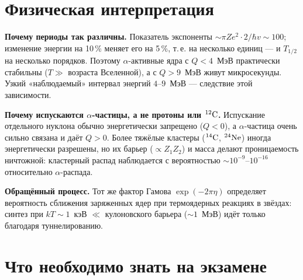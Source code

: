 \section{Физическая интерпретация}

\textbf{Почему периоды так различны.} Показатель экспоненты $\sim\pi Ze^2\cdot2/\hbar v\sim100$; изменение энергии на 10\,\% меняет его на 5\,\%,
т.\,е. на несколько единиц — и $T_{1/2}$ на несколько порядков. Поэтому $\alpha$-активные ядра с $Q<4$~МэВ практически стабильны
($T\gg$ возраста Вселенной), а с $Q>9$~МэВ живут микросекунды. Узкий «наблюдаемый» интервал энергий $4$--$9$~МэВ — следствие
этой зависимости.

\textbf{Почему испускаются $\alpha$-частицы, а не протоны или $\nucl{C}{12}$.} Испускание отдельного нуклона обычно энергетически
запрещено ($Q<0$), а $\alpha$-частица очень сильно связана и даёт $Q>0$. Более тяжёлые кластеры ($\nucl{C}{14}$, $\nucl{Ne}{24}$) иногда
энергетически разрешены, но их барьер ($\propto Z_1Z_2$) и масса делают проницаемость ничтожной: кластерный распад наблюдается с
вероятностью $\sim10^{-9}$--$10^{-16}$ относительно $\alpha$-распада.

\textbf{Обращённый процесс.} Тот же фактор Гамова $\exp(-2\pi\eta)$ определяет вероятность сближения заряженных ядер при
термоядерных реакциях в звёздах: синтез при $kT\sim1$~кэВ $\ll$ кулоновского барьера ($\sim1$~МэВ) идёт только благодаря туннелированию.

\section{Что необходимо знать на экзамене}

